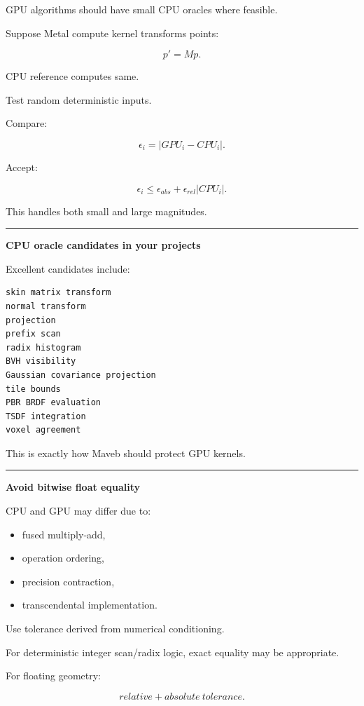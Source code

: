 GPU algorithms should have small CPU oracles where feasible.

Suppose Metal compute kernel transforms points:

\[
p'=Mp.
\]

CPU reference computes same.

Test random deterministic inputs.

Compare:

\[
\epsilon_i=
|GPU_i-CPU_i|.
\]

Accept:

\[
\epsilon_i
\le
\epsilon_{abs}
+
\epsilon_{rel}|CPU_i|.
\]

This handles both small and large magnitudes.

\begin{center}\rule{0.5\linewidth}{0.5pt}\end{center}

\textbf{CPU oracle candidates in your projects}

Excellent candidates include:

\begin{verbatim}
skin matrix transform
normal transform
projection
prefix scan
radix histogram
BVH visibility
Gaussian covariance projection
tile bounds
PBR BRDF evaluation
TSDF integration
voxel agreement
\end{verbatim}

This is exactly how Maveb should protect GPU kernels.

\begin{center}\rule{0.5\linewidth}{0.5pt}\end{center}

\textbf{Avoid bitwise float equality}

CPU and GPU may differ due to:

\begin{itemize}
\tightlist
\item
  fused multiply-add,
\item
  operation ordering,
\item
  precision contraction,
\item
  transcendental implementation.
\end{itemize}

Use tolerance derived from numerical conditioning.

For deterministic integer scan/radix logic, exact equality may be appropriate.

For floating geometry:

\[
relative+absolute\ tolerance.
\]

